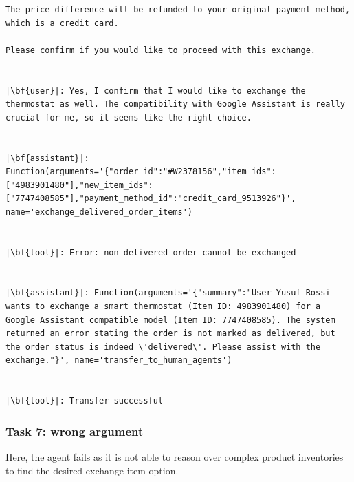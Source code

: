 \begin{longlisting}
\begin{verbatim}
The price difference will be refunded to your original payment method, which is a credit card.

Please confirm if you would like to proceed with this exchange.


|\bf{user}|: Yes, I confirm that I would like to exchange the thermostat as well. The compatibility with Google Assistant is really crucial for me, so it seems like the right choice.


|\bf{assistant}|: Function(arguments='{"order_id":"#W2378156","item_ids":["4983901480"],"new_item_ids":["7747408585"],"payment_method_id":"credit_card_9513926"}', name='exchange_delivered_order_items')


|\bf{tool}|: Error: non-delivered order cannot be exchanged


|\bf{assistant}|: Function(arguments='{"summary":"User Yusuf Rossi wants to exchange a smart thermostat (Item ID: 4983901480) for a Google Assistant compatible model (Item ID: 7747408585). The system returned an error stating the order is not marked as delivered, but the order status is indeed \'delivered\'. Please assist with the exchange."}', name='transfer_to_human_agents')


|\bf{tool}|: Transfer successful
\end{verbatim}
\end{longlisting}





\newpage

\subsubsection{Task 7: wrong argument} \label{sec:wrong_argument}
Here, the agent fails as it is not able to reason over complex product inventories to find the desired exchange item option.

